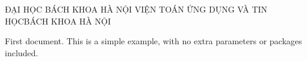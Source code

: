 \documentclass{article}
\begin{document}
ĐẠI HỌC BÁCH KHOA HÀ NỘI
VIỆN TOÁN ỨNG DỤNG VÀ TIN HỌCBÁCH KHOA HÀ NỘI 

First document. This is a simple example, with no
extra parameters or packages included.
\end{document}
